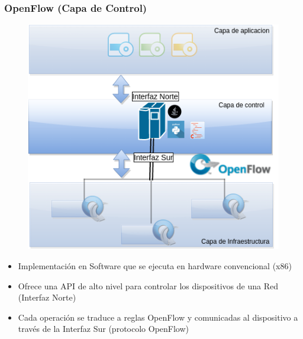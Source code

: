 \documentclass{beamer}
\begin{document}
\begin{frame}
\frametitle{OpenFlow (Capa de Control)} 
\begin{minipage}{0.40\textwidth}
	\begin{figure}[H]
		\centering
		\includegraphics[width=1.0\textwidth]{imagenes/openflowController.png}
	\end{figure}
\end{minipage}
\hfill
\begin{minipage}{0.58\textwidth}
\begin{itemize}
\item Implementaci\'on en Software que se ejecuta en hardware convencional (x86)
\item Ofrece una API de alto nivel para controlar los dispositivos de una Red (Interfaz Norte)
\item Cada operaci\'on se traduce a reglas OpenFlow y comunicadas al dispositivo a trav\'es de la Interfaz Sur (protocolo OpenFlow)
\end{itemize}

\end{minipage}
\end{frame}
\end{document}

